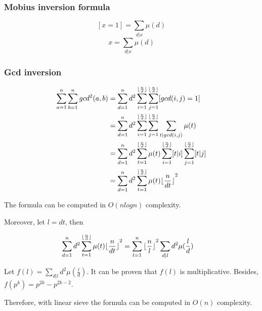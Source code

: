 \subsubsection{Mobius inversion formula}

$$[x = 1] = \sum_{d|x}\mu(d)$$
$$x = \sum_{d|x}\mu(d)$$

\subsubsection{Gcd inversion}
\begin{align*}
\sum_{a=1}^n\sum_{b=1}^ngcd^2(a,b)&=\sum_{d=1}^nd^2\sum_{i=1}^{\lfloor\frac{n}{d}\rfloor}\sum_{j=1}^{\lfloor\frac{n}{d}\rfloor}[gcd(i,j)=1]\\
&=\sum_{d=1}^nd^2\sum_{i=1}^{\lfloor\frac{n}{d}\rfloor}\sum_{j=1}^{\lfloor\frac{n}{d}\rfloor}\sum_{t|gcd(i,j)}\mu(t)\\
&=\sum_{d=1}^nd^2\sum_{t=1}^{\lfloor\frac{n}{d}\rfloor}\mu(t)\sum_{i=1}^{\lfloor\frac{n}{d}\rfloor}[t|i]\sum_{j=1}^{\lfloor\frac{n}{d}\rfloor}[t|j]\\
&=\sum_{d=1}^nd^2\sum_{t=1}^{\lfloor\frac{n}{d}\rfloor}\mu(t){\lfloor\frac{n}{dt}\rfloor}^2
\end{align*}

The formula can be computed in $O(nlogn)$ complexity.

Moreover, let $l=dt$, then

\begin{align*}
\sum_{d=1}^nd^2\sum_{t=1}^{\lfloor\frac{n}{d}\rfloor}\mu(t){\lfloor\frac{n}{dt}\rfloor}^2&=\sum_{l=1}^n{\lfloor\frac{n}{l}\rfloor}^2\sum_{d|l}d^2\mu(\frac{l}{d})
\end{align*}

Let $f(l)=\sum_{d|l}d^2\mu(\frac{l}{d})$. It can be proven that $f(l)$ is multiplicative. Besides, $f(p^k)=p^{2k}-p^{2k-2}$.

Therefore, with linear sieve the formula can be computed in $O(n)$ complexity.

